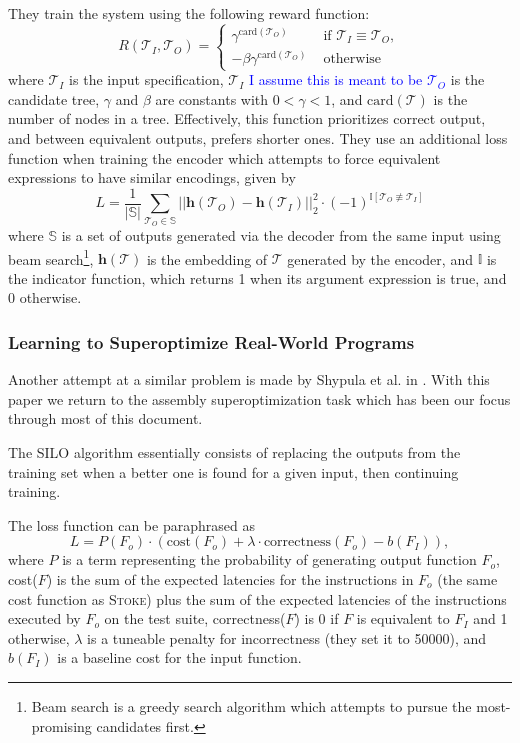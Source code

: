 \documentclass[12pt,twoside]{reedthesis}
\newcommand{\comment}[2]{\textbf{#1} \textcolor{blue}{#2}}
\begin{document}
They train the system using the following reward function:
\[
    R(\mathcal{T}_I,\mathcal{T}_O) =
        \begin{cases}
            \gamma^{\text{card}(\mathcal{T}_O)} & \text{ if } \mathcal{T}_I \equiv \mathcal{T}_O,
         \\ -\beta\gamma^{\text{card}(\mathcal{T}_O)} & \text{ otherwise}
        \end{cases}
\]
where $\mathcal{T}_I$ is the input specification, \comment{$\mathcal{T}_I$}{I assume this is meant to be $\mathcal{T}_O$} is the candidate tree, $\gamma$ and $\beta$ are constants with $0 < \gamma < 1$, and $\text{card}(\mathcal{T})$ is the number of nodes in a tree.
Effectively, this function prioritizes correct output, and between equivalent outputs, prefers shorter ones.
They use an additional loss function when training the encoder which attempts to force equivalent expressions to have similar encodings, given by
\[
    L = \frac{1}{|\mathbb{S}|} \sum_{\mathcal{T}_O \in \mathbb{S}} || \boldsymbol{h}(\mathcal{T}_O) - \boldsymbol{h}(\mathcal{T}_I) ||^2_2 \cdot (-1)^{\mathbb{I}[\mathcal{T}_O \not\equiv \mathcal{T}_I]}
\]
where $\mathbb{S}$ is a set of outputs generated via the decoder from the same input using beam search\footnote{Beam search is a greedy search algorithm which attempts to pursue the most-promising candidates first.}, $\boldsymbol{h}(\mathcal{T})$ is the embedding of $\mathcal{T}$ generated by the encoder, and $\mathbb{I}$ is the indicator function, which returns 1 when its argument expression is true, and 0 otherwise.

\subsubsection{Learning to Superoptimize Real-World Programs}
Another attempt at a similar problem is made by Shypula et al. in \cite{shypula2022learning}.
With this paper we return to the assembly superoptimization task which has been our focus through most of this document. 

The SILO algorithm essentially consists of replacing the outputs from the training set when a better one is found for a given input, then continuing training.

The loss function can be paraphrased as 
\[ L = P(F_o) \cdot (\text{cost}(F_o) + \lambda \cdot \text{correctness}(F_o) - b(F_I)), \]
where $P$ is a term representing the probability of generating output function $F_o$, cost($F$) is the sum of the expected latencies for the instructions in $F_o$ (the same cost function as \textsc{Stoke}) plus the sum of the expected latencies of the instructions executed by $F_o$ on the test suite, correctness($F$) is 0 if $F$ is equivalent to $F_I$ and 1 otherwise, $\lambda$ is a tuneable penalty for incorrectness (they set it to 50000), and $b(F_I)$ is a baseline cost for the input function.
\end{document}
